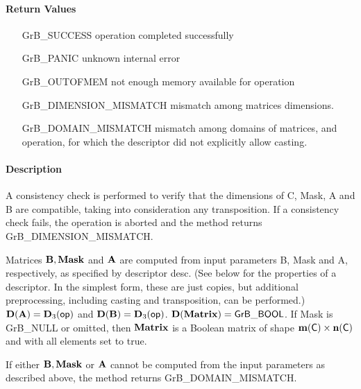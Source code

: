 \paragraph{Return Values}

\begin{itemize}[leftmargin=2.1in]
    \item[{\sf GrB\_SUCCESS}]             operation completed successfully
    \item[{\sf GrB\_PANIC}]               unknown internal error
    \item[{\sf GrB\_OUTOFMEM}]            not enough memory available for operation
    \item[{\sf GrB\_DIMENSION\_MISMATCH}] mismatch among matrices dimensions.
    \item[{\sf GrB\_DOMAIN\_MISMATCH}]    mismatch among domains of matrices, and operation, for which the descriptor did not explicitly allow casting.
\end{itemize}

\paragraph{Description}

A consistency check is performed to verify that the
dimensions of {\sf C}, {\sf Mask}, {\sf A} and {\sf B}
are compatible, taking into consideration any transposition. If a 
consistency check fails, the operation is
aborted and the method returns {\sf GrB\_DIMENSION\_MISMATCH}.


Matrices ${\bf B}, {\bf Mask}$ and ${\bf A}$ are computed from
input parameters {\sf B}, {\sf Mask} and {\sf A}, respectively, as specified
by descriptor {\sf desc}. (See below for the properties of a descriptor. In
the simplest form, these are just copies, but additional preprocessing,
including casting and transposition, can be performed.)  $\bold{D}({\bf A}) =
\bold{D}_3({\sf op})$ and $\bold{D}({\bf B}) = \bold{D}_3({\sf op})$.
$\bold{D}({\bf Matrix}) = {\sf GrB\_BOOL}$.  If {\sf Mask} is {\sf GrB\_NULL} or omitted,
then ${\bf Matrix}$ is a Boolean matrix of shape 
$\bold{m}({\bf \sf C}) \times \bold{n}({\bf \sf C})$
and with all elements set to {\sf true}.

If either ${\bf B}, {\bf Mask}$ or ${\bf A}$ cannot be computed
from the input parameters as described above, the method returns 
{\sf GrB\_DOMAIN\_MISMATCH}. 

